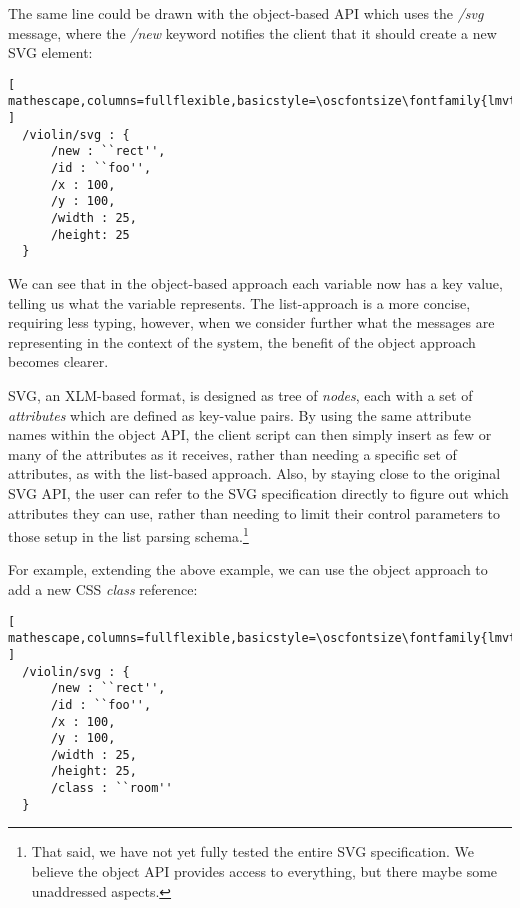 \noindent
The same line could be drawn with the object-based API which uses the \textit{/svg} message, where the \textit{/new} keyword notifies the client that it should create a new SVG element:

\begin{minipage}{\linewidth}
\begin{lstlisting}[ mathescape,columns=fullflexible,basicstyle=\oscfontsize\fontfamily{lmvtt}\selectfont ]
  /violin/svg : {
      /new : ``rect'',
      /id : ``foo'',
      /x : 100,
      /y : 100,
      /width : 25,
      /height: 25
  }
\end{lstlisting}
\end{minipage}

\noindent
We can see that in the object-based approach each variable now has a key value, telling us what the variable represents.
The list-approach is a more concise, requiring less typing, however, when we consider further what the messages are representing in the context of the \drawsocket system, the benefit of the object approach becomes clearer.

SVG, an XLM-based format, is designed as tree of \textit{nodes}, each with a set of \textit{attributes} which are defined as key-value pairs.
By using the same attribute names within the \drawsocket object API, the client script can then simply insert as few or many of the attributes as it receives, rather than needing a specific set of attributes, as with the list-based approach.
Also, by staying close to the original SVG API, the user can refer to the SVG specification directly to figure out which attributes they can use, rather than needing to limit their control parameters to those setup in the list parsing schema.\footnote{That said, we have not yet fully tested the entire SVG specification. We believe the object API provides access to everything, but there maybe some unaddressed aspects.} 


For example, extending the above example, we can use the object approach to add a new CSS \textit{class} reference:

\begin{minipage}{\linewidth}
\begin{lstlisting}[ mathescape,columns=fullflexible,basicstyle=\oscfontsize\fontfamily{lmvtt}\selectfont ]
  /violin/svg : {
      /new : ``rect'',
      /id : ``foo'',
      /x : 100,
      /y : 100,
      /width : 25,
      /height: 25,
      /class : ``room''
  }
\end{lstlisting}
\end{minipage}

